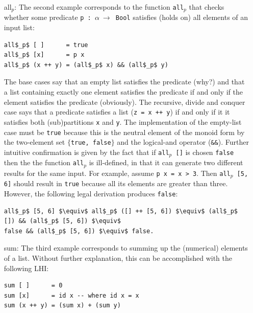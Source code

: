 \documentclass[acmsmall,review]{acmart}\settopmatter{printfolios=true,printccs=false,printacmref=false}
\begin{document}
\begin{itemize}
\item[all$_p$:] The second example corresponds to the function {\tt all$_p$}
            that checks whether some predicate {\tt p : $\alpha ~\rightarrow$ Bool}
            satisfies (holds on) all elements of an input list:
\begin{lstlisting}[mathescape=true]
all$_p$ [ ]      = true
all$_p$ [x]      = p x
all$_p$ (x ++ y) = (all$_p$ x) && (all$_p$ y)   
\end{lstlisting}\vspace{-2ex}
            The base cases say that an empty list satisfies the
            predicate (why?) and that a list containing exactly
            one element satisfies the predicate if and only if
            the element satisfies the predicate (obviously). 
            The recursive, divide and conquer case says that
            a predicate satisfies a list (\lstinline{z = x ++ y}) 
            if and only if it it satisfies both (sub)partitions 
            {\tt x} and {\tt y}.
            The implementation of the empty-list case must be
            \lstinline{true} because this is the neutral element of
            the monoid form by the two-element set 
            {\tt $\{$true, false$\}$} and the logical-and operator (\lstinline{&&}).
            Further intuitive confirmation is given by the fact
            that if {\tt all$_p$ []} is chosen \lstinline{false}
            then the the function {\tt all$_p$} is ill-defined,
            in that it can generate two different results for the same
            input. For example, assume \lstinline{p x = x > 3}. Then 
            {\tt all$_p$ [5, 6]} should result in \lstinline{true}
            because all its elements are greater than three. However,
            the following legal derivation produces \lstinline{false}:
\begin{lstlisting}[mathescape=true]
all$_p$ [5, 6] $\equiv$ all$_p$ ([] ++ [5, 6]) $\equiv$ (all$_p$ []) && (all$_p$ [5, 6]) $\equiv$ 
false && (all$_p$ [5, 6]) $\equiv$ false.
\end{lstlisting}

\item[sum:] The third example corresponds to summing up the (numerical) elements
            of a list. Without further explanation, this can be accomplished
            with the following LHI:
\begin{lstlisting}[mathescape=true]
sum [ ]      = 0
sum [x]      = id x -- where id x = x
sum (x ++ y) = (sum x) + (sum y)
\end{lstlisting}\vspace{-2ex}


\end{itemize}
\end{document}
